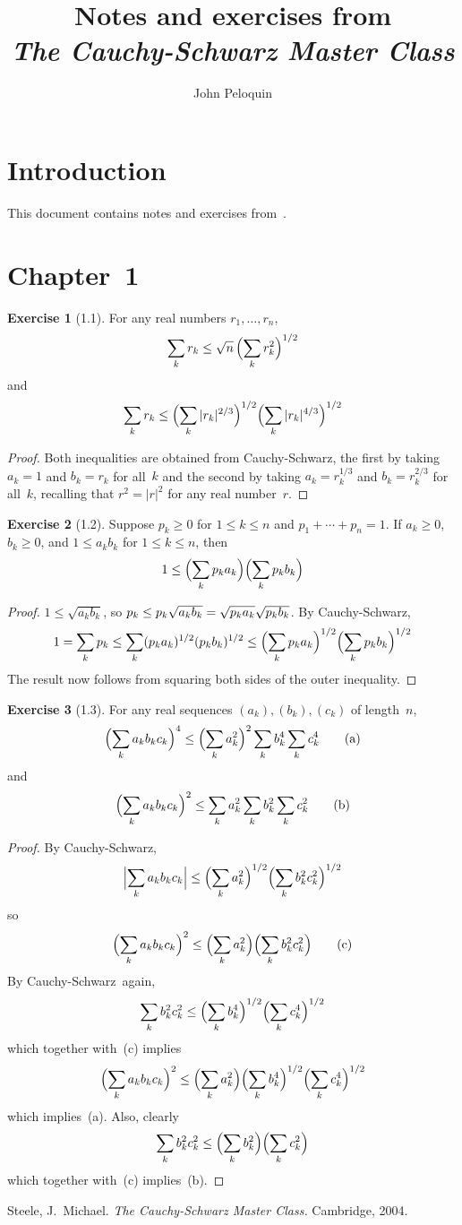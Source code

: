 \documentclass[letterpaper,12pt]{article}
\title{Notes and exercises from\\\textit{The Cauchy-Schwarz Master Class}}
\author{John Peloquin}
\date{}
\newcommand{\CS}{Cauchy-Schwarz}
\newcommand{\Biglp}[1]{\Bigl({#1}\Bigr)}
\newcommand{\abs}[1]{|{#1}|}
\newcommand{\Biglabs}[1]{\Bigl|{#1}\Bigr|}
\theoremstyle{definition}
\newtheorem*{exer}{Exercise}
\theoremstyle{remark}
\begin{document}
\maketitle

\section*{Introduction}
This document contains notes and exercises from~\cite{steele}.

\section*{Chapter~1}
\begin{exer}[1.1]
For any real numbers \(r_1,\ldots,r_n\),
\[\sum_k r_k\le\sqrt{n}\,\Biglp{\sum_k r_k^2}^{1/2}\]
and
\[\sum_k r_k\le\Biglp{\sum_k\abs{r_k}^{2/3}}^{1/2}\Biglp{\sum_k\abs{r_k}^{4/3}}^{1/2}\]
\end{exer}
\begin{proof}
Both inequalities are obtained from \CS, the first by taking \(a_k=1\) and \(b_k=r_k\) for all~\(k\) and the second by taking \(a_k=r_k^{1/3}\) and \(b_k=r_k^{2/3}\) for all~\(k\), recalling that \(r^2=\abs{r}^2\) for any real number~\(r\).
\end{proof}

\begin{exer}[1.2]
Suppose \(p_k\ge 0\) for \(1\le k\le n\) and \(p_1+\cdots+p_n=1\). If \(a_k\ge 0\), \(b_k\ge 0\), and \(1\le a_kb_k\) for \(1\le k\le n\), then
\[1\le\Biglp{\sum_k p_ka_k}\Biglp{\sum_k p_kb_k}\]
\end{exer}
\begin{proof}
\(1\le\sqrt{a_kb_k}\), so \(p_k\le p_k\sqrt{a_kb_k}=\sqrt{p_ka_k\vphantom{b_k}}\sqrt{p_kb_k}\). By \CS,
\[1=\sum_k p_k\le\sum_k(p_ka_k)^{1/2}(p_kb_k)^{1/2}\le\Biglp{\sum_k p_ka_k}^{1/2}\Biglp{\sum_k p_kb_k}^{1/2}\]
The result now follows from squaring both sides of the outer inequality.
\end{proof}

\begin{exer}[1.3]
For any real sequences \((a_k),(b_k),(c_k)\) of length~\(n\),
\[\Biglp{\sum_k a_kb_kc_k}^4\le\Biglp{\sum_k a_k^2}^2\sum_k b_k^4\sum_k c_k^4\tag{a}\]
and
\[\Biglp{\sum_k a_kb_kc_k}^2\le\sum_k a_k^2\sum_k b_k^2\sum_k c_k^2\tag{b}\]
\end{exer}
\begin{proof}
By \CS,
\[\Biglabs{\sum_k a_kb_kc_k}\le\Biglp{\sum_k a_k^2}^{1/2}\Biglp{\sum_k b_k^2c_k^2}^{1/2}\]
so
\[\Biglp{\sum_k a_kb_kc_k}^2\le\Biglp{\sum_k a_k^2}\Biglp{\sum_k b_k^2c_k^2}\tag{c}\]
By \CS\ again,
\[\sum_k b_k^2c_k^2\le\Biglp{\sum_k b_k^4}^{1/2}\Biglp{\sum_k c_k^4}^{1/2}\]
which together with~(c) implies
\[\Biglp{\sum_k a_kb_kc_k}^2\le\Biglp{\sum_k a_k^2}\Biglp{\sum_k b_k^4}^{1/2}\Biglp{\sum_k c_k^4}^{1/2}\]
which implies~(a). Also, clearly
\[\sum_k b_k^2c_k^2\le\Biglp{\sum_k b_k^2}\Biglp{\sum_k c_k^2}\]
which together with~(c) implies~(b).
\end{proof}

\begin{thebibliography}{0}
 Steele, J.~Michael. \textit{The Cauchy-Schwarz Master Class.} Cambridge, 2004.
\end{thebibliography}
\end{document}
